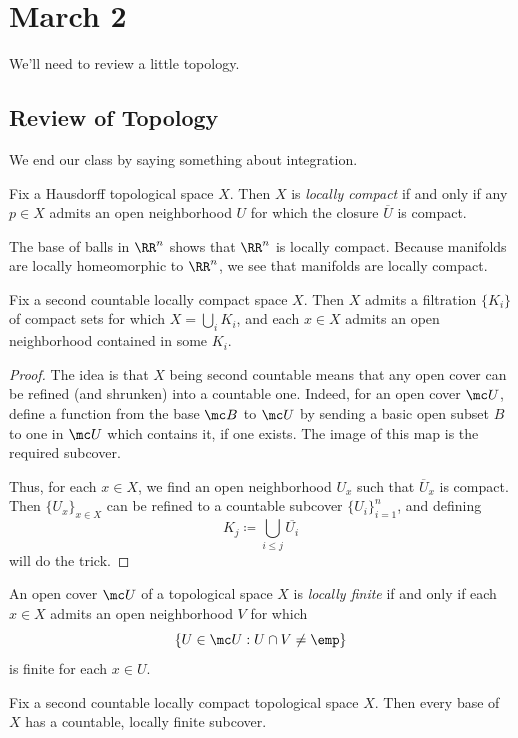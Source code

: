 \documentclass[../notes.tex]{subfiles}
\begin{document}
\section{March 2}
We'll need to review a little topology.

\subsection{Review of Topology}
We end our class by saying something about integration.
\begin{definition}
	Fix a Hausdorff topological space $X$. Then $X$ is \textit{locally compact} if and only if any $p\in X$ admits an open neighborhood $U$ for which the closure $\overline U$ is compact.
\end{definition}
\begin{example}
	The base of balls in $\RR^n$ shows that $\RR^n$ is locally compact. Because manifolds are locally homeomorphic to $\RR^n$, we see that manifolds are locally compact.
\end{example}
\begin{lemma} \label{lem:filter-locally-compact-space}
	Fix a second countable locally compact space $X$. Then $X$ admits a filtration $\{K_i\}$ of compact sets for which $X=\bigcup_iK_i$, and each $x\in X$ admits an open neighborhood contained in some $K_i$.
\end{lemma}
\begin{proof}
	The idea is that $X$ being second countable means that any open cover can be refined (and shrunken) into a countable one. Indeed, for an open cover $\mc U$, define a function from the base $\mc B$ to $\mc U$ by sending a basic open subset $B$ to one in $\mc U$ which contains it, if one exists. The image of this map is the required subcover.
	
	Thus, for each $x\in X$, we find an open neighborhood $U_x$ such that $\overline{U}_x$ is compact. Then $\{U_x\}_{x\in X}$ can be refined to a countable subcover $\{U_i\}_{i=1}^n$, and defining
	\[K_j\coloneqq\bigcup_{i\le j}\overline{U_i}\]
	will do the trick.
\end{proof}
\begin{definition}
	An open cover $\mc U$ of a topological space $X$ is \textit{locally finite} if and only if each $x\in X$ admits an open neighborhood $V$ for which
	\[\{U\in\mc U:U\cap V\ne\emp\}\]
	is finite for each $x\in U$.
\end{definition}
\begin{lemma} \label{lem:locally-finite-subcover}
	Fix a second countable locally compact topological space $X$. Then every base of $X$ has a countable, locally finite subcover.
\end{lemma}
\end{document}
